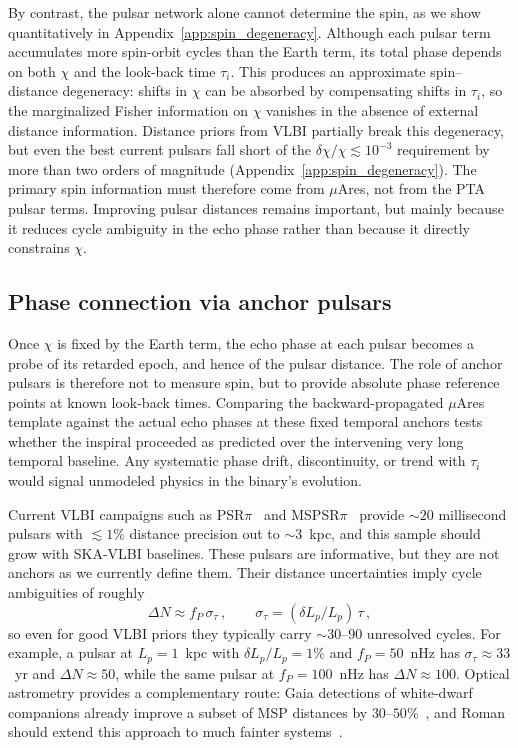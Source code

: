 \documentclass[aps,prx,twocolumn,superscriptaddress,nofootinbib,longbibliography]{revtex4-2}
\begin{document}
By contrast, the pulsar network alone cannot determine the spin, as we show quantitatively in Appendix~\ref{app:spin_degeneracy}. Although each pulsar term accumulates more spin-orbit cycles than the Earth term, its total phase depends on both $\chi$ and the look-back time $\tau_i$. This produces an approximate spin--distance degeneracy: shifts in $\chi$ can be absorbed by compensating shifts in $\tau_i$, so the marginalized Fisher information on $\chi$ vanishes in the absence of external distance information. Distance priors from VLBI partially break this degeneracy, but even the best current pulsars fall short of the $\delta\chi/\chi \lesssim 10^{-3}$ requirement by more than two orders of magnitude (Appendix~\ref{app:spin_degeneracy}). The primary spin information must therefore come from $\mu$Ares, not from the PTA pulsar terms. Improving pulsar distances remains important, but mainly because it reduces cycle ambiguity in the echo phase rather than because it directly constrains $\chi$.

\subsection{Phase connection via anchor pulsars}\label{sec:phase_connection}

Once $\chi$ is fixed by the Earth term, the echo phase at each pulsar becomes a probe of its retarded epoch, and hence of the pulsar distance. The role of anchor pulsars is therefore not to measure spin, but to provide absolute phase reference points at known look-back times. Comparing the backward-propagated $\mu$Ares template against the actual echo phases at these fixed temporal anchors tests whether the inspiral proceeded as predicted over the intervening very long temporal baseline. Any systematic phase drift, discontinuity, or trend with $\tau_i$ would signal unmodeled physics in the binary's evolution.

Current VLBI campaigns such as PSR$\pi$~\cite{Deller2019} and MSPSR$\pi$~\cite{Ding2023} provide $\sim20$ millisecond pulsars with $\lesssim1\%$ distance precision out to $\sim3$~kpc, and this sample should grow with SKA-VLBI baselines. These pulsars are informative, but they are not anchors as we currently define them. Their distance uncertainties imply cycle ambiguities of roughly
\begin{equation}\label{eq:cycle_ambig}
\Delta N \approx f_P\,\sigma_\tau \, ,
\qquad
\sigma_\tau = (\delta L_p/L_p)\,\tau \, ,
\end{equation}
so even for good VLBI priors they typically carry $\sim30$--$90$ unresolved cycles. For example, a pulsar at $L_p = 1$~kpc with $\delta L_p/L_p = 1\%$ and $f_P = 50$~nHz has $\sigma_\tau \approx 33$~yr and $\Delta N \approx 50$, while the same pulsar at $f_P = 100$~nHz has $\Delta N \approx 100$. Optical astrometry provides a complementary route: Gaia detections of white-dwarf companions already improve a subset of MSP distances by \mbox{$30$--$50\%$}~\cite{Moran2023}, and Roman should extend this approach to much fainter systems~\cite{McKinnon2026}.
\end{document}
